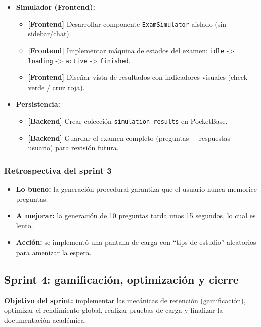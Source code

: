 \begin{itemize}
\item \textbf{Simulador (Frontend):}
\begin{itemize}
\item \textbf{[Frontend]} Desarrollar componente \texttt{ExamSimulator} aislado (sin sidebar/chat).
\item \textbf{[Frontend]} Implementar máquina de estados del examen: \texttt{idle} -> \texttt{loading} -> \texttt{active} -> \texttt{finished}.
\item \textbf{[Frontend]} Diseñar vista de resultados con indicadores visuales (check verde / cruz roja).
\end{itemize}
\end{itemize}

\begin{itemize}
\item \textbf{Persistencia:}
\begin{itemize}
\item \textbf{[Backend]} Crear colección \texttt{simulation\_results} en PocketBase.
\item \textbf{[Backend]} Guardar el examen completo (preguntas + respuestas usuario) para revisión futura.
\end{itemize}
\end{itemize}

\subsubsection{Retrospectiva del sprint 3}
\begin{itemize}
\item \textbf{Lo bueno:} la generación procedural garantiza que el usuario nunca memorice preguntas.
\item \textbf{A mejorar:} la generación de 10 preguntas tarda unos 15 segundos, lo cual es lento.
\item \textbf{Acción:} se implementó una pantalla de carga con \enquote{tips de estudio} aleatorios para amenizar la espera.
\end{itemize}

\subsection{Sprint 4: gamificación, optimización y cierre}

\textbf{Objetivo del sprint:} implementar las mecánicas de retención (gamificación), optimizar el rendimiento global, realizar pruebas de carga y finalizar la documentación académica.


